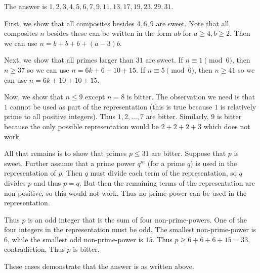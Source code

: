 The answer is $1,2,3,4,5,6,7,9,11,13,17,19,23,29,31$.

First, we show that all composites besides $4,6,9$ are sweet. Note that all composites $n$ besides these can be written in the form $ab$ for $a\geq4,b\geq2$. Then we can use $n=b+b+b+(a-3)b$.

Next, we show that all primes larger than $31$ are sweet. If $n\equiv1\pmod6$, then $n\geq37$ so we can use $n=6k+6+10+15$. If $n\equiv5\pmod6$, then $n\geq41$ so we can use $n=6k+10+10+15$.

Now, we show that $n\leq9$ except $n=8$ is bitter. The observation we need is that $1$ cannot be used as part of the representation (this is true because $1$ is relatively prime to all positive integers). Thus $1,2,\dots,7$ are bitter. Similarly, $9$ is bitter because the only possible representation would be $2+2+2+3$ which does not work.

All that remains is to show that primes $p\leq31$ are bitter. Suppose that $p$ is sweet. Further assume that a prime power $q^m$ (for a prime $q$) is used in the representation of $p$. Then $q$ must divide each term of the representation, so $q$ divides $p$ and thus $p=q$. But then the remaining terms of the representation are non-positive, so this would not work. Thus no prime power can be used in the representation.

Thus $p$ is an odd integer that is the sum of four non-prime-powers. One of the four integers in the representation must be odd. The smallest non-prime-power is $6$, while the smallest odd non-prime-power is $15$. Thus $p\geq6+6+6+15=33$, contradiction. Thus $p$ is bitter.

These cases demonstrate that the answer is as written above.
